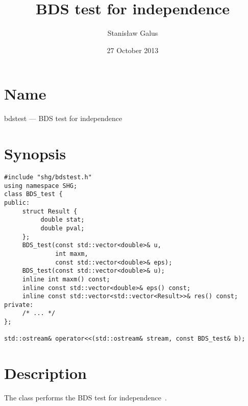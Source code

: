 \documentclass[a4paper,11pt]{article}
\title{BDS test for independence}
\author{Stanis{\l}aw Galus}
\date{27 October 2013}
\begin{document}
\maketitle

\section{Name}

bdstest --- BDS test for independence

\section{Synopsis}

{\small \begin{verbatim}
#include "shg/bdstest.h"
using namespace SHG;
class BDS_test {
public:
     struct Result {
          double stat;
          double pval;
     };
     BDS_test(const std::vector<double>& u,
              int maxm,
              const std::vector<double>& eps);
     BDS_test(const std::vector<double>& u);
     inline int maxm() const;
     inline const std::vector<double>& eps() const;
     inline const std::vector<std::vector<Result>>& res() const;
private:
     /* ... */
};

std::ostream& operator<<(std::ostream& stream, const BDS_test& b);
\end{verbatim}}

\section{Description}

The class performs the BDS test for independence~\cite
{brock-dechert-scheinkman-lebaron-1996}.
\end{document}
